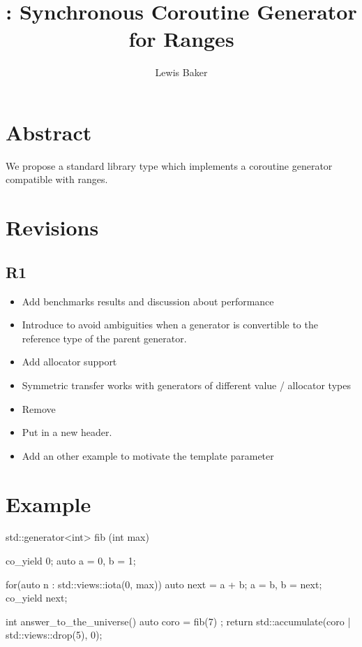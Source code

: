 \documentclass{wg21}
\title{\tcode{std::generator}: Synchronous Coroutine Generator for Ranges}
\author{Lewis Baker}{lewissbaker@gmail.com}
\begin{document}
\maketitle


\section{Abstract}

We propose a standard library type  which implements a coroutine generator compatible with ranges.

\section{Revisions}

\subsection{R1}
\begin{itemize}
\item Add benchmarks results and discussion about performance
\item Introduce  to avoid ambiguities when a generator is convertible to the reference type of the parent generator.
\item Add allocator support
\item Symmetric transfer works with generators of different value / allocator types
\item Remove 
\item Put  in a new  header.
\item Add an other example to motivate the  template parameter
\end{itemize}


\section{Example}

\begin{colorblock}
    std::generator<int> fib (int max) {
        co_yield 0;
        auto a = 0, b = 1;
        
        for(auto n : std::views::iota(0, max))  {
            auto next = a + b;
            a = b, b = next;
            co_yield next;
        }
    }
    
    int answer_to_the_universe() {
        auto coro = fib(7) ;
        return std::accumulate(coro | std::views::drop(5), 0);
    }
    
\end{colorblock}
\end{document}
